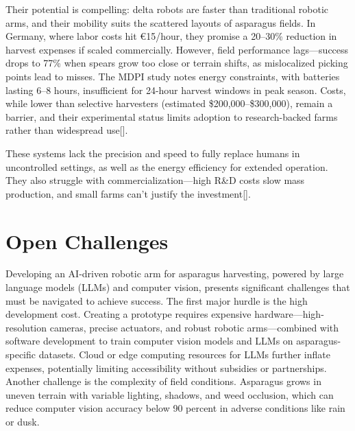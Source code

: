 Their potential is compelling: delta robots are faster than traditional robotic arms, and their mobility suits the scattered layouts of asparagus fields. In Germany, where labor costs hit €15/hour, they promise a 20--30\% reduction in harvest expenses if scaled commercially. However, field performance lags—success drops to 77\% when spears grow too close or terrain shifts, as mislocalized picking points lead to misses. The MDPI study notes energy constraints, with batteries lasting 6--8 hours, insufficient for 24-hour harvest windows in peak season. Costs, while lower than selective harvesters (estimated \$200,000--\$300,000), remain a barrier, and their experimental status limits adoption to research-backed farms rather than widespread use[\cite{mdpi2023mobile}].

These systems lack the precision and speed to fully replace humans in uncontrolled settings, as well as the energy efficiency for extended operation. They also struggle with commercialization—high R\&D costs slow mass production, and small farms can’t justify the investment[\cite{waea2004simulation}].


\section{Open Challenges}



Developing an AI-driven robotic arm for asparagus harvesting, powered by large language models (LLMs) and computer vision, presents significant challenges that must be navigated to achieve success. The first major hurdle is the high development cost. Creating a prototype requires expensive hardware—high-resolution cameras, precise actuators, and robust robotic arms—combined with software development to train computer vision models and LLMs on asparagus-specific datasets. Cloud or edge computing resources for LLMs further inflate expenses, potentially limiting accessibility without subsidies or partnerships. Another challenge is the complexity of field conditions. Asparagus grows in uneven terrain with variable lighting, shadows, and weed occlusion, which can reduce computer vision accuracy below 90 percent in adverse conditions like rain or dusk.


